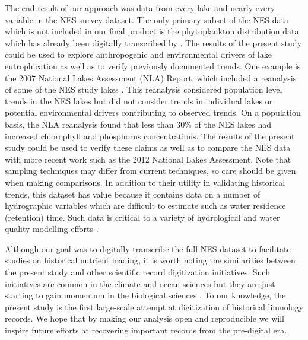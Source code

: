 \documentclass[journal abbreviations, manuscript]{copernicus}
\begin{document}
The end result of our approach was data from every lake and nearly every variable in the NES survey dataset. The only primary subset of the NES data which is not included in our final product is the phytoplankton distribution data which has already been digitally transcribed by \citet{stomp2011large}. The results of the present study could be used to explore anthropogenic and environmental drivers of lake eutrophication as well as to verify previously documented trends. One example is the 2007 National Lakes Assessment (NLA) Report, which included a reanalysis of some of the NES study lakes \citep{nla-methods}. This reanalysis considered population level trends in the NES lakes but did not consider trends in individual lakes or potential environmental drivers contributing to observed trends. On a population basis, the NLA reanalysis found that less than 30\% of the NES lakes had increased chlorophyll and phosphorus concentrations. The results of the present study could be used to verify these claims as well as to compare the NES data with more recent work such as the 2012 National Lakes Assessment.  Note that sampling techniques may differ from current techniques, so care should be given when making comparisons. In addition to their utility in validating historical trends, this dataset has value because it contains data on a number of hydrographic variables which are difficult to estimate such as water residence (retention) time. Such data is critical to a variety of hydrological and water quality modelling efforts \citep{Brettreviewreassessmentlake2007}. 

Although our goal was to digitally transcribe the full NES dataset to facilitate studies on historical nutrient loading, it is worth noting the similarities between the present study and other scientific record digitization initiatives. Such initiatives are common in the climate and ocean sciences but they are just starting to gain momentum in the biological sciences \citep{allan2011international, freeman2017icoads}. To our knowledge, the present study is the first large-scale attempt at digitization of historical limnology records. We hope that by making our analysis open and reproducible we will inspire future efforts at recovering important records from the pre-digital era.

\end{document}

